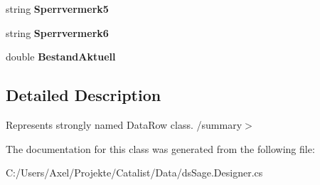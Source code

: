 \begin{DoxyCompactItemize}
\item 
string {\bfseries Sperrvermerk5}\hypertarget{class_products_1_1_data_1_1ds_sage_1_1_artikel_row_a60918bd61647a97c2925b9840b75041c}{}\label{class_products_1_1_data_1_1ds_sage_1_1_artikel_row_a60918bd61647a97c2925b9840b75041c}

\item 
string {\bfseries Sperrvermerk6}\hypertarget{class_products_1_1_data_1_1ds_sage_1_1_artikel_row_a924ce2af78ef662a8ab3c01d5928a85f}{}\label{class_products_1_1_data_1_1ds_sage_1_1_artikel_row_a924ce2af78ef662a8ab3c01d5928a85f}

\item 
double {\bfseries Bestand\+Aktuell}\hypertarget{class_products_1_1_data_1_1ds_sage_1_1_artikel_row_a5f94d2c8e6e9dceaaea38c67f210306d}{}\label{class_products_1_1_data_1_1ds_sage_1_1_artikel_row_a5f94d2c8e6e9dceaaea38c67f210306d}

\end{DoxyCompactItemize}


\subsection{Detailed Description}
Represents strongly named Data\+Row class. /summary$>$ 

The documentation for this class was generated from the following file\+:\begin{DoxyCompactItemize}
\item 
C\+:/\+Users/\+Axel/\+Projekte/\+Catalist/\+Data/ds\+Sage.\+Designer.\+cs\end{DoxyCompactItemize}
